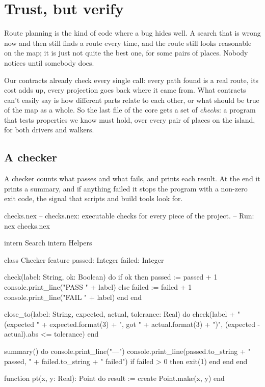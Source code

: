 \chapter{Trust, but verify}\label{ch:checks}

Route planning is the kind of code where a bug hides well. A search that
is wrong now and then still finds a route every time, and the route still
looks reasonable on the map; it is just not quite the best one, for some
pairs of places. Nobody notices until somebody does.

Our contracts already check every single call: every path found is a real
route, its cost adds up, every projection goes back where it came from.
What contracts can't easily say is how different parts relate to each
other, or what should be true of the map as a whole. So the last file of
the core gets a set of \emph{checks}: a program that tests properties we
know must hold, over every pair of places on the island, for both drivers
and walkers.

\section{A checker}

A checker counts what passes and what fails, and prints each result. At
the end it prints a summary, and if anything failed it stops the program
with a non-zero exit code, the signal that scripts and build tools look
for.

\begin{newfile}{checks.nex}
-- checks.nex: executable checks for every piece of the project.
-- Run: nex checks.nex

intern Search
intern Helpers

class Checker
feature
  passed: Integer
  failed: Integer

  check(label: String, ok: Boolean) do
    if ok then
      passed := passed + 1
      console.print_line("PASS " + label)
    else
      failed := failed + 1
      console.print_line("FAIL " + label)
    end
  end

  close_to(label: String, expected, actual, tolerance: Real) do
    check(label + " (expected " + expected.format(3) + ", got " + actual.format(3) + ")",
      (expected - actual).abs <= tolerance)
  end

  summary() do
    console.print_line("---")
    console.print_line(passed.to_string + " passed, " + failed.to_string + " failed")
    if failed > 0 then
      exit(1)
    end
  end
end

function pt(x, y: Real): Point do
  result := create Point.make(x, y)
end
\end{newfile}

